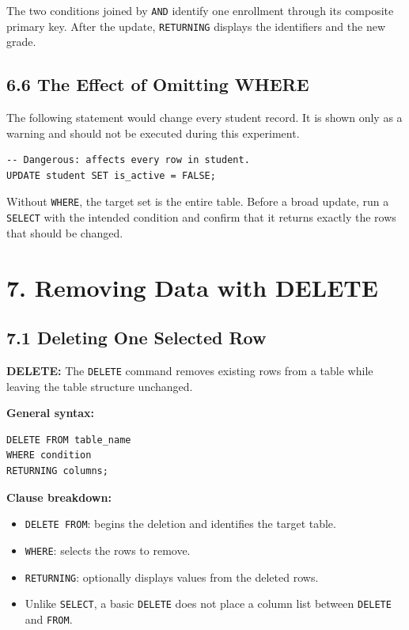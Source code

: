\documentclass[12pt,a4paper]{article}
\newcommand{\defbox}[2]{%
  \vspace{0.2cm}
  \noindent\colorbox{boxgray}{\parbox{\dimexpr\linewidth-2\fboxsep}{%
    \textbf{#1:} #2
  }}
  \vspace{0.2cm}
}
\begin{document}
\noindent The two conditions joined by \texttt{AND} identify one enrollment through its composite
primary key. After the update, \texttt{RETURNING} displays the identifiers and the new grade.

\subsection*{6.6 The Effect of Omitting WHERE}
The following statement would change every student record. It is shown only as a warning and
should not be executed during this experiment.

\begin{verbatim}
-- Dangerous: affects every row in student.
UPDATE student SET is_active = FALSE;
\end{verbatim}

\noindent Without \texttt{WHERE}, the target set is the entire table. Before a broad update, run a
\texttt{SELECT} with the intended condition and confirm that it returns exactly the rows that
should be changed.

\section*{7. Removing Data with DELETE}

\subsection*{7.1 Deleting One Selected Row}
\defbox{DELETE}{The \texttt{DELETE} command removes existing rows from a table while leaving the table structure unchanged.}

\noindent\textbf{General syntax:}
\begin{verbatim}
DELETE FROM table_name
WHERE condition
RETURNING columns;
\end{verbatim}

\noindent\textbf{Clause breakdown:}
\begin{itemize}
    \item \texttt{DELETE FROM}: begins the deletion and identifies the target table.
    \item \texttt{WHERE}: selects the rows to remove.
    \item \texttt{RETURNING}: optionally displays values from the deleted rows.
    \item Unlike \texttt{SELECT}, a basic \texttt{DELETE} does not place a column list between \texttt{DELETE} and \texttt{FROM}.
\end{itemize}
\end{document}
